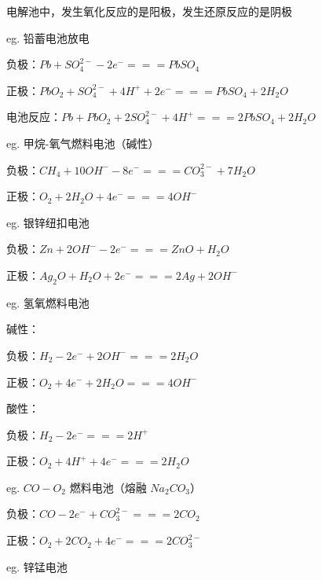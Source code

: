 \documentclass[UTF8,zihao=-4,openany]{ctexbook}
\begin{document}
电解池中，发生氧化反应的是阳极，发生还原反应的是阴极\par

eg. 铅蓄电池放电\par

负极：$Pb+SO_4^{2-}-2e^-=\!=\!=PbSO_4$\par

正极：$PbO_2+SO_4^{2-}+4H^++2e^-=\!=\!=PbSO_4+2H_2O$\par

电池反应：$Pb+PbO_2+2SO_4^{2-}+4H^+=\!=\!=2PbSO_4+2H_2O$\par

\medskip
eg. 甲烷-氧气燃料电池（碱性）\par

负极：$CH_4+10OH^--8e^-=\!=\!=CO_3^{2-}+7H_2O$\par

正极：$O_2+2H_2O+4e^-=\!=\!=4OH^-$\par

\medskip
eg. 银锌纽扣电池\par

负极：$Zn+2OH^--2e^-=\!=\!=ZnO+H_2O$\par

正极：$Ag_2O+H_2O+2e^-=\!=\!=2Ag+2OH^-$\par

\medskip
eg. 氢氧燃料电池\par

碱性：\par

负极：$H_2-2e^-+2OH^-=\!=\!=2H_2O$\par

正极：$O_2+4e^-+2H_2O=\!=\!=4OH^-$\par

酸性：\par

负极：$H_2-2e^-=\!=\!=2H^+$\par

正极：$O_2+4H^++4e^-=\!=\!=2H_2O$\par

\medskip
eg. $CO-O_2$ 燃料电池（熔融 $Na_2CO_3$）\par

负极：$CO-2e^-+CO_3^{2-}=\!=\!=2CO_2$\par

正极：$O_2+2CO_2+4e^-=\!=\!=2CO_3^{2-}$\par

\medskip
eg. 锌锰电池\par
\end{document}
